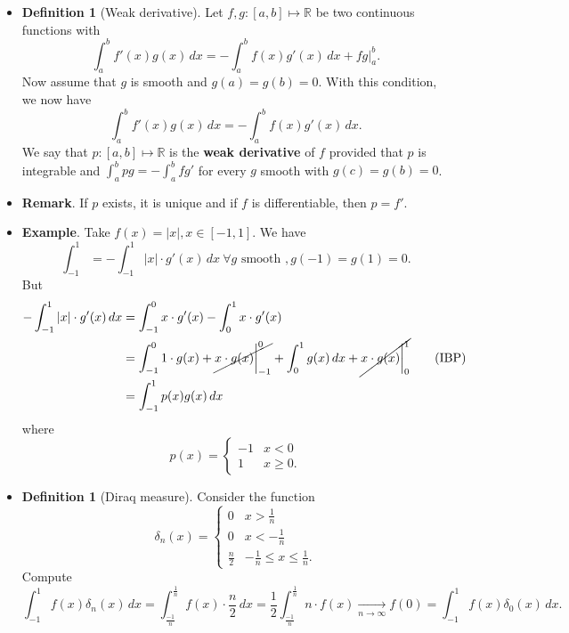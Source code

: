\documentclass{article}
\newcommand{\R}{\mathbb{R}}
\newcommand{\?}{\stackrel{?}{=}}
\theoremstyle{definition} %
\newtheorem{definition}[theorem]{Definition} %
\begin{document}
\begin{itemize}
    \item[]
    \begin{definition}[Weak derivative]
        Let $f, g: [a, b] \mapsto \R$ be two continuous functions with
        $$\int_a^b f'(x)g(x) \,dx = -\int_a^b f(x)g'(x) \,dx + fg\bigg|_a^b.$$
        Now assume that $g$ is smooth and $g(a) = g(b) = 0$. With this condition, we now have
        $$\int_a^b f'(x)g(x) \,dx = -\int_a^b f(x)g'(x) \,dx.$$
        We say that $p: [a, b] \mapsto \R$ is the \textbf{weak derivative} of $f$ provided that $p$ is integrable and $\int_a^b pg = -\int_a^b fg'$ for every $g$ smooth with $g(c) = g(b) = 0$.
    \end{definition}
    \item \textbf{Remark}. If $p$ exists, it is unique and if $f$ is differentiable, then $p = f'$.
    \item \textbf{Example}. Take $f(x) = |x|, x \in [-1, 1]$. We have
    $$\int_{-1}^1 = -\int_{-1}^1 |x| \cdot g'(x) \,dx \ \forall g \text{ smooth }, g(-1) = g(1) = 0.$$
    But
    \begin{align*}
        -\int_{-1}^1|x| \cdot g'(x) \,dx &= \int_{-1}^0 x \cdot g'(x) - \int_0^1 x \cdot g'(x) \\
        &= \int_{-1}^0 1 \cdot g(x) + \cancel{x \cdot g(x) \bigg|_{-1}^0} + \int_0^1 g(x) \,dx + \cancel{x \cdot g(x) \bigg|_0^1} \tag{\text{IBP}} \\
        &= \int_{-1}^1 p(x)g(x) \,dx
    \end{align*}
    where
    \[
    p(x) =
    \begin{cases}
        -1 & x < 0 \\
        1 & x \geq 0.
    \end{cases}
    \]
    \item[]
    \begin{definition}[Diraq measure]
        Consider the function
        \[
        \delta_n(x) =
        \begin{cases}
            0 & x > \frac{1}{n} \\
            0 & x < -\frac{1}{n} \\
            \frac{n}{2} & -\frac{1}{n} \leq x \leq \frac{1}{n}.
        \end{cases}
        \]
        Compute
        $$\int_{-1}^1 f(x) \delta_n(x) \,dx = \int_{\frac{-1}{n}}^{\frac{1}{n}} f(x) \cdot \frac{n}{2} \,dx = \frac{1}{2} \int_{\frac{-1}{n}}^{\frac{1}{n}} n \cdot f(x) \underset{n \rightarrow \infty}{\longrightarrow} f(0) = \int_{-1}^1 f(x) \delta_0(x) \,dx.$$

\end{definition}
\end{itemize}
\end{document}
